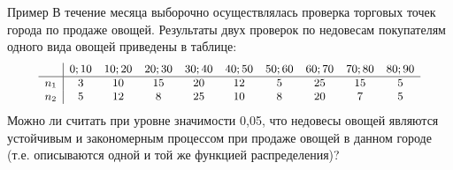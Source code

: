 \documentclass[unicode,11pt,notheorems,xcolor=table]{beamer}
\begin{document}
 \begin{frame}{Пример}{}
    В течение месяца выборочно осуществлялась проверка торговых точек города по продаже овощей. Результаты двух проверок по недовесам покупателям одного вида овощей приведены в таблице:
    $$
    \small
    \begin{array}{c|ccccccccc}
            &0;10  & 10;20 & 20;30 & 30;40 &40;50 &50;60 & 60;70 & 70;80 & 80;90 \\
        \hline
        n_1 & 3    & 10    & 15    & 20    & 12   & 5    & 25    & 15    &  5 \\
        n_2 & 5    & 12    & 8     & 25    & 10   & 8    & 20    & 7     &  5 \\
    \end{array}
    $$
    Можно ли считать при уровне значимости 0,05, что недовесы овощей являются устойчивым и закономерным процессом при продаже овощей в данном городе (т.е. описываются одной и той же функцией распределения)?
 \end{frame}
\end{document}

